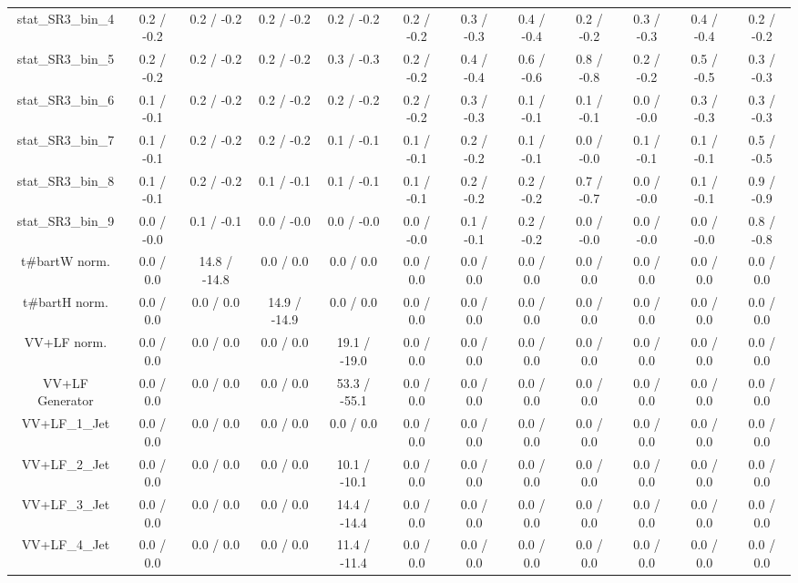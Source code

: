 \begin{table}[htbp]
\begin{center}
\begin{tabular}{|c|c|c|c|c|c|c|c|c|c|c|c|}
 stat_SR3_bin_4 & 0.2 / -0.2 & 0.2 / -0.2 & 0.2 / -0.2 & 0.2 / -0.2 & 0.2 / -0.2 & 0.3 / -0.3 & 0.4 / -0.4 & 0.2 / -0.2 & 0.3 / -0.3 & 0.4 / -0.4 & 0.2 / -0.2 \\ 
 stat_SR3_bin_5 & 0.2 / -0.2 & 0.2 / -0.2 & 0.2 / -0.2 & 0.3 / -0.3 & 0.2 / -0.2 & 0.4 / -0.4 & 0.6 / -0.6 & 0.8 / -0.8 & 0.2 / -0.2 & 0.5 / -0.5 & 0.3 / -0.3 \\ 
 stat_SR3_bin_6 & 0.1 / -0.1 & 0.2 / -0.2 & 0.2 / -0.2 & 0.2 / -0.2 & 0.2 / -0.2 & 0.3 / -0.3 & 0.1 / -0.1 & 0.1 / -0.1 & 0.0 / -0.0 & 0.3 / -0.3 & 0.3 / -0.3 \\ 
 stat_SR3_bin_7 & 0.1 / -0.1 & 0.2 / -0.2 & 0.2 / -0.2 & 0.1 / -0.1 & 0.1 / -0.1 & 0.2 / -0.2 & 0.1 / -0.1 & 0.0 / -0.0 & 0.1 / -0.1 & 0.1 / -0.1 & 0.5 / -0.5 \\ 
 stat_SR3_bin_8 & 0.1 / -0.1 & 0.2 / -0.2 & 0.1 / -0.1 & 0.1 / -0.1 & 0.1 / -0.1 & 0.2 / -0.2 & 0.2 / -0.2 & 0.7 / -0.7 & 0.0 / -0.0 & 0.1 / -0.1 & 0.9 / -0.9 \\ 
 stat_SR3_bin_9 & 0.0 / -0.0 & 0.1 / -0.1 & 0.0 / -0.0 & 0.0 / -0.0 & 0.0 / -0.0 & 0.1 / -0.1 & 0.2 / -0.2 & 0.0 / -0.0 & 0.0 / -0.0 & 0.0 / -0.0 & 0.8 / -0.8 \\ 
  t#bar{t}W norm. & 0.0 / 0.0 & 14.8 / -14.8 & 0.0 / 0.0 & 0.0 / 0.0 & 0.0 / 0.0 & 0.0 / 0.0 & 0.0 / 0.0 & 0.0 / 0.0 & 0.0 / 0.0 & 0.0 / 0.0 & 0.0 / 0.0 \\ 
  t#bar{t}H norm. & 0.0 / 0.0 & 0.0 / 0.0 & 14.9 / -14.9 & 0.0 / 0.0 & 0.0 / 0.0 & 0.0 / 0.0 & 0.0 / 0.0 & 0.0 / 0.0 & 0.0 / 0.0 & 0.0 / 0.0 & 0.0 / 0.0 \\ 
  VV+LF norm. & 0.0 / 0.0 & 0.0 / 0.0 & 0.0 / 0.0 & 19.1 / -19.0 & 0.0 / 0.0 & 0.0 / 0.0 & 0.0 / 0.0 & 0.0 / 0.0 & 0.0 / 0.0 & 0.0 / 0.0 & 0.0 / 0.0 \\ 
  VV+LF Generator & 0.0 / 0.0 & 0.0 / 0.0 & 0.0 / 0.0 & 53.3 / -55.1 & 0.0 / 0.0 & 0.0 / 0.0 & 0.0 / 0.0 & 0.0 / 0.0 & 0.0 / 0.0 & 0.0 / 0.0 & 0.0 / 0.0 \\ 
  VV+LF_1_Jet & 0.0 / 0.0 & 0.0 / 0.0 & 0.0 / 0.0 & 0.0 / 0.0 & 0.0 / 0.0 & 0.0 / 0.0 & 0.0 / 0.0 & 0.0 / 0.0 & 0.0 / 0.0 & 0.0 / 0.0 & 0.0 / 0.0 \\ 
  VV+LF_2_Jet & 0.0 / 0.0 & 0.0 / 0.0 & 0.0 / 0.0 & 10.1 / -10.1 & 0.0 / 0.0 & 0.0 / 0.0 & 0.0 / 0.0 & 0.0 / 0.0 & 0.0 / 0.0 & 0.0 / 0.0 & 0.0 / 0.0 \\ 
  VV+LF_3_Jet & 0.0 / 0.0 & 0.0 / 0.0 & 0.0 / 0.0 & 14.4 / -14.4 & 0.0 / 0.0 & 0.0 / 0.0 & 0.0 / 0.0 & 0.0 / 0.0 & 0.0 / 0.0 & 0.0 / 0.0 & 0.0 / 0.0 \\ 
  VV+LF_4_Jet & 0.0 / 0.0 & 0.0 / 0.0 & 0.0 / 0.0 & 11.4 / -11.4 & 0.0 / 0.0 & 0.0 / 0.0 & 0.0 / 0.0 & 0.0 / 0.0 & 0.0 / 0.0 & 0.0 / 0.0 & 0.0 / 0.0 \\ 

\end{tabular}
\end{center}
\end{table}
